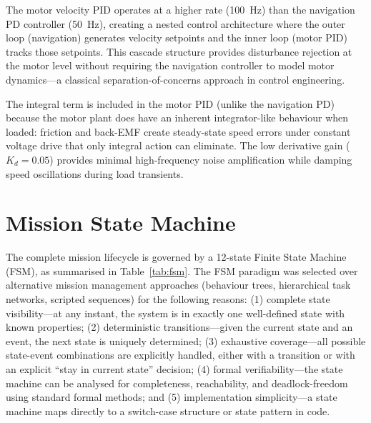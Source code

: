 \documentclass[12pt,a4paper,oneside]{report}
\begin{document}
The motor velocity PID operates at a higher rate (100~Hz) than the navigation PD controller (50~Hz), creating a nested control architecture where the outer loop (navigation) generates velocity setpoints and the inner loop (motor PID) tracks those setpoints. This cascade structure provides disturbance rejection at the motor level without requiring the navigation controller to model motor dynamics---a classical separation-of-concerns approach in control engineering.

The integral term is included in the motor PID (unlike the navigation PD) because the motor plant does have an inherent integrator-like behaviour when loaded: friction and back-EMF create steady-state speed errors under constant voltage drive that only integral action can eliminate. The low derivative gain ($K_d = 0.05$) provides minimal high-frequency noise amplification while damping speed oscillations during load transients.

\section{Mission State Machine}

The complete mission lifecycle is governed by a 12-state Finite State Machine (FSM), as summarised in Table~\ref{tab:fsm}. The FSM paradigm was selected over alternative mission management approaches (behaviour trees, hierarchical task networks, scripted sequences) for the following reasons: (1) complete state visibility---at any instant, the system is in exactly one well-defined state with known properties; (2) deterministic transitions---given the current state and an event, the next state is uniquely determined; (3) exhaustive coverage---all possible state-event combinations are explicitly handled, either with a transition or with an explicit ``stay in current state'' decision; (4) formal verifiability---the state machine can be analysed for completeness, reachability, and deadlock-freedom using standard formal methods; and (5) implementation simplicity---a state machine maps directly to a switch-case structure or state pattern in code.
\end{document}

